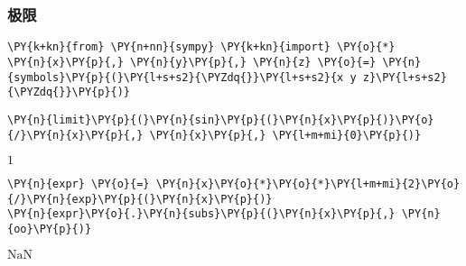     \hypertarget{ux6781ux9650}{%
\subsubsection{极限}\label{ux6781ux9650}}

    \begin{tcolorbox}[breakable, size=fbox, boxrule=1pt, pad at break*=1mm,colback=cellbackground, colframe=cellborder]
\begin{Verbatim}[commandchars=\\\{\}]
\PY{k+kn}{from} \PY{n+nn}{sympy} \PY{k+kn}{import} \PY{o}{*}
\PY{n}{x}\PY{p}{,} \PY{n}{y}\PY{p}{,} \PY{n}{z} \PY{o}{=} \PY{n}{symbols}\PY{p}{(}\PY{l+s+s2}{\PYZdq{}}\PY{l+s+s2}{x y z}\PY{l+s+s2}{\PYZdq{}}\PY{p}{)}
\end{Verbatim}
\end{tcolorbox}

    \begin{tcolorbox}[breakable, size=fbox, boxrule=1pt, pad at break*=1mm,colback=cellbackground, colframe=cellborder]
\begin{Verbatim}[commandchars=\\\{\}]
\PY{n}{limit}\PY{p}{(}\PY{n}{sin}\PY{p}{(}\PY{n}{x}\PY{p}{)}\PY{o}{/}\PY{n}{x}\PY{p}{,} \PY{n}{x}\PY{p}{,} \PY{l+m+mi}{0}\PY{p}{)}
\end{Verbatim}
\end{tcolorbox}
 
            
    
    $\displaystyle 1$

    

    \begin{tcolorbox}[breakable, size=fbox, boxrule=1pt, pad at break*=1mm,colback=cellbackground, colframe=cellborder]
\begin{Verbatim}[commandchars=\\\{\}]
\PY{n}{expr} \PY{o}{=} \PY{n}{x}\PY{o}{*}\PY{o}{*}\PY{l+m+mi}{2}\PY{o}{/}\PY{n}{exp}\PY{p}{(}\PY{n}{x}\PY{p}{)}
\PY{n}{expr}\PY{o}{.}\PY{n}{subs}\PY{p}{(}\PY{n}{x}\PY{p}{,} \PY{n}{oo}\PY{p}{)}
\end{Verbatim}
\end{tcolorbox}
 
            
    
    $\displaystyle \text{NaN}$

    


